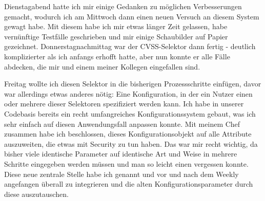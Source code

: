 
Dienstagabend hatte ich mir einige Gedanken zu möglichen Verbesserungen gemacht, wodurch ich am Mittwoch dann einen neuen Versuch an diesem System gewagt habe.
Mit diesem habe ich mir etwas länger Zeit gelassen, habe vernünftige Testfälle geschrieben und mir einige Schaubilder auf Papier gezeichnet.
Donnerstagnachmittag war der CVSS-Selektor dann fertig - deutlich komplizierter als ich anfangs erhofft hatte, aber nun konnte er alle Fälle abdecken, die mir und einem meiner Kollegen eingefallen sind.


Freitag wollte ich diesen Selektor in die bisherigen Prozessschritte einfügen, davor war allerdings etwas anderes nötig:
Eine Konfiguration, in der ein Nutzer einen oder mehrere dieser Selektoren spezifiziert werden kann.
Ich habe in unserer Codebasis bereits ein recht umfangreiches Konfigurationssystem gebaut, was ich sehr einfach auf diesen Anwendungsfall anpassen konnte.
Mit meinem Chef zusammen habe ich beschlossen, dieses Konfigurationsobjekt auf alle Attribute auszuweiten, die etwas mit Security zu tun haben.
Das war mir recht wichtig, da bisher viele identische Parameter auf identische Art und Weise in mehrere Schritte eingegeben werden müssen und man so leicht einen vergessen konnte.
Diese neue zentrale Stelle habe ich  genannt und vor und nach dem Weekly angefangen überall zu integrieren und die alten Konfigurationsparameter durch diese auszutauschen.
